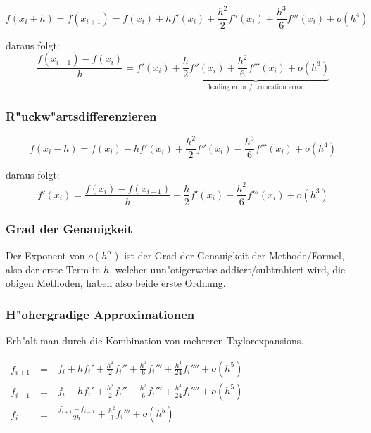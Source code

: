 \documentclass[german, 10pt, a4paper, twocolumn]{scrartcl}
\begin{document}
\small
\begin{displaymath}
	f(x_i+h) = f(x_{i+1})=f(x_i)+hf'(x_i)+\frac{h^2}{2}f''(x_i)+\frac{h^3}{6}f'''(x_i)+o(h^4)
\end{displaymath}
\normalsize

daraus folgt:
\begin{displaymath}
	\frac{f(x_{i+1})-f(x_i)}{h}=f'(x_i)+\underbrace{\frac{h}{2}f''(x_i)+\frac{h^2}{6}f'''(x_i)+o(h^3)}_{\mbox{leading error / truncation error}}
\end{displaymath}

\subsubsection{R"uckw"artsdifferenzieren}

\small
\begin{displaymath}
	f(x_i-h)=f(x_i)-hf'(x_i)+\frac{h^2}{2}f''(x_i)-\frac{h^3}{6}f'''(x_i) + o(h^4)
\end{displaymath}
\normalsize

daraus folgt:
\begin{displaymath}
	f'(x_i)=\frac{f(x_i)-f(x_{i-1})}{h}+\frac{h}{2}f'(x_i)-\frac{h^2}{6}f'''(x_i) + o(h^3)
\end{displaymath}

\subsubsection{Grad der Genauigkeit}

Der Exponent von $o(h^\alpha)$ ist der Grad der Genauigkeit der Methode/Formel, also der erste Term in $h$, welcher unn"otigerweise addiert/subtrahiert wird, die obigen Methoden, haben also beide erste Ordnung.

\subsubsection{H"ohergradige Approximationen}

Erh"alt man durch die Kombination von mehreren Taylorexpansions.\\

\begin{tabular}{lcl}
	$f_{i+1}$ &	 = &	 $f_i + hf_i' + \frac{h^2}{2}f_i'' + \frac{h^3}{6}f_i''' +\frac{h^4}{24}f_i''''+o(h^5)$ \\
	$f_{i-1}$ &	 = &	 $f_i - hf_i' + \frac{h^2}{2}f_i'' - \frac{h^3}{6}f_i''' +\frac{h^4}{24}f_i''''+o(h^5)$ \\
	\hline
	$f_i$ &		 = &	 $\frac{f_{i+1}-f_{i-1}}{2h}+\frac{h^2}{3}f_i'''+o(h^5)$
\end{tabular}\\
\end{document}
